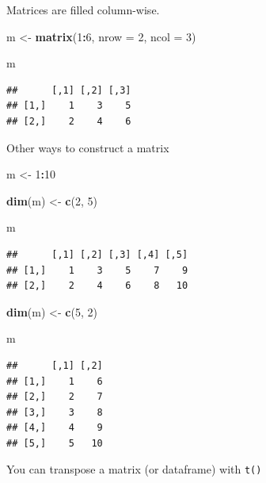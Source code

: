 \documentclass[
]{book}
\newenvironment{Shaded}{\begin{snugshade}}{\end{snugshade}}
\newcommand{\AttributeTok}[1]{\textcolor[rgb]{0.13,0.29,0.53}{#1}}
\newcommand{\DecValTok}[1]{\textcolor[rgb]{0.00,0.00,0.81}{#1}}
\newcommand{\FunctionTok}[1]{\textcolor[rgb]{0.13,0.29,0.53}{\textbf{#1}}}
\newcommand{\NormalTok}[1]{#1}
\newcommand{\OtherTok}[1]{\textcolor[rgb]{0.56,0.35,0.01}{#1}}
\newcommand{\SpecialCharTok}[1]{\textcolor[rgb]{0.81,0.36,0.00}{\textbf{#1}}}
\begin{document}
Matrices are filled column-wise.

\begin{Shaded}
\begin{Highlighting}[]
\NormalTok{m }\OtherTok{\textless{}{-}} \FunctionTok{matrix}\NormalTok{(}\DecValTok{1}\SpecialCharTok{:}\DecValTok{6}\NormalTok{, }\AttributeTok{nrow =} \DecValTok{2}\NormalTok{, }\AttributeTok{ncol =} \DecValTok{3}\NormalTok{)}

\NormalTok{m}
\end{Highlighting}
\end{Shaded}

\begin{verbatim}
##      [,1] [,2] [,3]
## [1,]    1    3    5
## [2,]    2    4    6
\end{verbatim}

Other ways to construct a matrix

\begin{Shaded}
\begin{Highlighting}[]
\NormalTok{m }\OtherTok{\textless{}{-}} \DecValTok{1}\SpecialCharTok{:}\DecValTok{10}

\FunctionTok{dim}\NormalTok{(m) }\OtherTok{\textless{}{-}} \FunctionTok{c}\NormalTok{(}\DecValTok{2}\NormalTok{, }\DecValTok{5}\NormalTok{)}

\NormalTok{m}
\end{Highlighting}
\end{Shaded}

\begin{verbatim}
##      [,1] [,2] [,3] [,4] [,5]
## [1,]    1    3    5    7    9
## [2,]    2    4    6    8   10
\end{verbatim}

\begin{Shaded}
\begin{Highlighting}[]
\FunctionTok{dim}\NormalTok{(m) }\OtherTok{\textless{}{-}} \FunctionTok{c}\NormalTok{(}\DecValTok{5}\NormalTok{, }\DecValTok{2}\NormalTok{)}

\NormalTok{m}
\end{Highlighting}
\end{Shaded}

\begin{verbatim}
##      [,1] [,2]
## [1,]    1    6
## [2,]    2    7
## [3,]    3    8
## [4,]    4    9
## [5,]    5   10
\end{verbatim}

You can transpose a matrix (or dataframe) with \texttt{t()}
\end{document}
